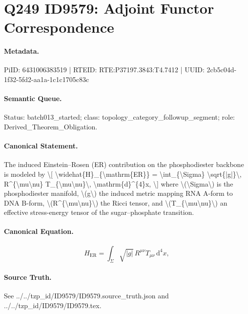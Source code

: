 \section*{Q249 ID9579: Adjoint Functor Correspondence}
\paragraph{Metadata.}
PiID: 6431006383519 | RTEID: RTE:P37197.3843:T4.7412 | UUID: 2cb5c04d-1f32-5fd2-aa1a-1c1c1705c83c

\paragraph{Semantic Queue.}
Status: batch013\_started; class: topology\_category\_followup\_segment; role: Derived\_Theorem\_Obligation.

\paragraph{Canonical Statement.}
The induced Einstein--Rosen (ER) contribution on the phosphodiester backbone is modeled by \textbackslash{}[ \textbackslash{}widehat\{H\}\_\{\textbackslash{}mathrm\{ER\}\} = \textbackslash{}int\_\{\textbackslash{}Sigma\} \textbackslash{}sqrt\{|g|\}\textbackslash{}, R\textasciicircum{}\{\textbackslash{}mu\textbackslash{}nu\} T\_\{\textbackslash{}mu\textbackslash{}nu\}\textbackslash{}, \textbackslash{}mathrm\{d\}\textasciicircum{}\{4\}x, \textbackslash{}] where \textbackslash{}(\textbackslash{}Sigma\textbackslash{}) is the phosphodiester manifold, \textbackslash{}(g\textbackslash{}) the induced metric mapping RNA A-form to DNA B-form, \textbackslash{}(R\textasciicircum{}\{\textbackslash{}mu\textbackslash{}nu\}\textbackslash{}) the Ricci tensor, and \textbackslash{}(T\_\{\textbackslash{}mu\textbackslash{}nu\}\textbackslash{}) an effective stress-energy tensor of the sugar--phosphate transition.

\paragraph{Canonical Equation.}
\[
\widehat{H}_{\mathrm{ER}} = \int_{\Sigma} \sqrt{|g|}\, R^{\mu\nu} T_{\mu\nu}\, \mathrm{d}^{4}x,
\]

\paragraph{Source Truth.}
See ../../tzp\_id/ID9579/ID9579.source\_truth.json and ../../tzp\_id/ID9579/ID9579.tex.
